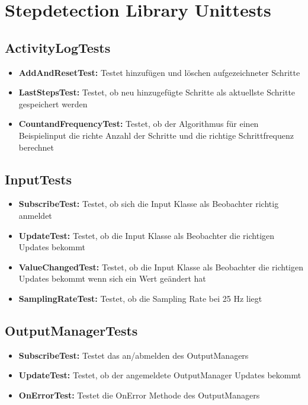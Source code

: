 \documentclass[../validierung.tex]{subfiles}
\begin{document}
\section{Stepdetection Library Unittests}
\subsection{ActivityLogTests}
\begin{itemize}
\item \textbf{AddAndResetTest:} Testet hinzufügen und löschen aufgezeichneter Schritte
\item \textbf{LastStepsTest:} Testet, ob neu hinzugefügte Schritte als aktuellste Schritte gespeichert werden
\item \textbf{CountandFrequencyTest:} Testet, ob der Algorithmus für einen Beispielinput die richte Anzahl der Schritte und die richtige Schrittfrequenz berechnet
\end{itemize}
\subsection{InputTests}
\begin{itemize}
\item \textbf{SubscribeTest:} Testet, ob sich die Input Klasse als Beobachter richtig anmeldet
\item \textbf{UpdateTest:} Testet, ob die Input Klasse als Beobachter die richtigen Updates bekommt
\item \textbf{ValueChangedTest:} Testet, ob die Input Klasse als Beobachter die richtigen Updates bekommt wenn sich ein Wert geändert hat
\item \textbf{SamplingRateTest:} Testet, ob die Sampling Rate bei 25 Hz liegt
\end{itemize}
\subsection{OutputManagerTests}
\begin{itemize}
\item \textbf{SubscribeTest:} Testet das an/abmelden des OutputManagers
\item \textbf{UpdateTest:} Testet, ob der angemeldete OutputManager Updates bekommt
\item \textbf{OnErrorTest:} Testet die OnError Methode des OutputManagers
\end{itemize}
\end{document}
